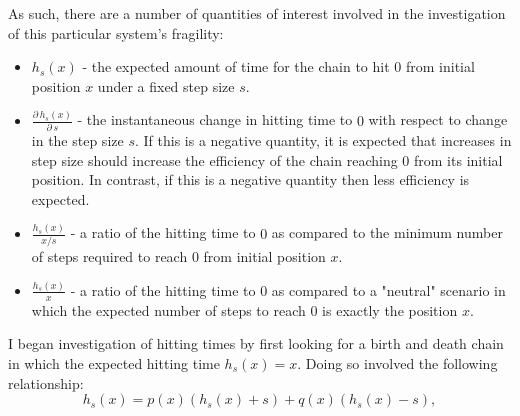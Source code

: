 As such, there are a number of quantities of interest involved in the investigation of this particular
system's fragility:
\begin{itemize}
    \item   $h_s(x)$ - the expected amount of time for the chain to hit $0$ from initial position $x$
        under a fixed step size $s$.
    \item   $\frac{\partial\, h_s(x)}{\partial\, s}$ - the instantaneous change in hitting time to $0$
        with respect to change in the step size $s$. If this is a negative quantity, it is expected
        that increases in step size should increase the efficiency of the chain reaching $0$ from its
        initial position. In contrast, if this is a negative quantity then less efficiency is expected.
    \item   $\frac{h_s(x)}{x/s}$ - a ratio of the hitting time to $0$ as compared to the minimum number
        of steps required to reach $0$ from initial position $x$.
    \item   $\frac{h_s(x)}{x}$ - a ratio of the hitting time to $0$ as compared to a "neutral" scenario
        in which the expected number of steps to reach $0$ is exactly the position $x$.
\end{itemize}

I began investigation of hitting times by first looking for a birth and death chain in which the
expected hitting time $h_s(x) = x$. Doing so involved the following relationship:
\[
    h_s(x) = p(x)(h_s(x) + s) + q(x)(h_s(x) - s),
\]

